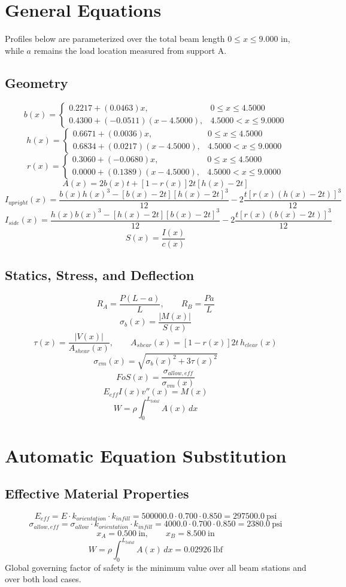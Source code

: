 \documentclass[11pt]{article}
\begin{document}
\section*{General Equations}
Profiles below are parameterized over the total beam length $0 \le x \le 9.000$ in, while $a$ remains the load location measured from support A.
\subsection*{Geometry}
\[
b(x)=\begin{cases}0.2217 + (0.0463)x, & 0 \le x \le 4.5000\\0.4300 + (-0.0511)(x-4.5000), & 4.5000 < x \le 9.0000\end{cases}
\]
\[
h(x)=\begin{cases}0.6671 + (0.0036)x, & 0 \le x \le 4.5000\\0.6834 + (0.0217)(x-4.5000), & 4.5000 < x \le 9.0000\end{cases}
\]
\[
r(x)=\begin{cases}0.3060 + (-0.0680)x, & 0 \le x \le 4.5000\\0.0000 + (0.1389)(x-4.5000), & 4.5000 < x \le 9.0000\end{cases}
\]
\[
A(x)=2b(x)t+[1-r(x)]2t[h(x)-2t]
\]
\[
I_{upright}(x)=\frac{b(x)h(x)^3-[b(x)-2t][h(x)-2t]^3}{12}-2\frac{t[r(x)(h(x)-2t)]^3}{12}
\]
\[
I_{side}(x)=\frac{h(x)b(x)^3-[h(x)-2t][b(x)-2t]^3}{12}-2\frac{t[r(x)(b(x)-2t)]^3}{12}
\]
\[
S(x)=\frac{I(x)}{c(x)}
\]

\subsection*{Statics, Stress, and Deflection}
\[
R_A=\frac{P(L-a)}{L}, \qquad R_B=\frac{Pa}{L}
\]
\[
\sigma_b(x)=\frac{|M(x)|}{S(x)}
\]
\[
\tau(x)=\frac{|V(x)|}{A_{shear}(x)}, \qquad A_{shear}(x)=[1-r(x)]2t\,h_{clear}(x)
\]
\[
\sigma_{vm}(x)=\sqrt{\sigma_b(x)^2+3\tau(x)^2}
\]
\[
FoS(x)=\frac{\sigma_{allow,eff}}{\sigma_{vm}(x)}
\]
\[
E_{eff}I(x)v''(x)=M(x)
\]
\[
W=\rho\int_0^{L_{total}} A(x)\,dx
\]

\section*{Automatic Equation Substitution}
\subsection*{Effective Material Properties}
\[E_{eff} = E \cdot k_{orientation} \cdot k_{infill} = 500000.0 \cdot 0.700 \cdot 0.850 = 297500.0\ \mathrm{psi}\]
\[\sigma_{allow,eff} = \sigma_{allow} \cdot k_{orientation} \cdot k_{infill} = 4000.0 \cdot 0.700 \cdot 0.850 = 2380.0\ \mathrm{psi}\]
\[x_A = 0.500\ \mathrm{in}, \qquad x_B = 8.500\ \mathrm{in}\]
\[W = \rho \int_0^{L_{total}} A(x)\,dx = 0.02926\ \mathrm{lbf}\]
Global governing factor of safety is the minimum value over all beam stations and over both load cases.
\end{document}

